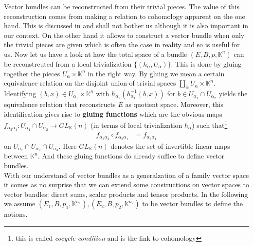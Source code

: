 Vector bundles can be reconstructed from their trivial pieces. The value of this reconstruction comes from making a relation to cohomology apparent on the one hand. This is discussed in \cite{catctxphysics} and shall not bother us although it is also important in our context. On the other hand it allows to construct a vector bundle when only the trivial pieces are given which is often the case in reality and so is useful for us. Now let us have a look at how the total space of a bundle $(E,B,p,\mathbb{K}^{n})$ can be reconstrcuted from a local trivialization $\lbrace (h_{\alpha},U_{\alpha}) \rbrace$. This is done by {\glqq}gluing together{\grqq} the pieces $U_{\alpha} \times \mathbb{K}^{n}$ in the right way. By gluing we mean a certain equivalence relation on the disjoint union of trivial spaces $\coprod_{\alpha}U_{\alpha} \times \mathbb{K}^{n}$. Identifying $(b,x) \in U_{\alpha_{1}} \times \mathbb{K}^{n}$ with $h_{\alpha_{2}}(h_{\alpha_{1}}^{-1}(b,x))$ for $b \in U_{\alpha_{1}} \cap U_{\alpha_{2}}$ yields the equivalence relation that reconstructs $E$ as quotient space. Moreover, this identification gives rise to \textbf{gluing functions} which are the obvious maps $f_{\alpha_{2}\alpha_{1}} \colon U_{\alpha_{1}} \cap U_{\alpha_{2}} \to GL_{\mathbb{K}}(n)$ (in terms of local trivialization $h_{\alpha}$) such that\footnote{this is called \textit{cocycle condition} and is the link to cohomology}
\begin{align*}
  f_{\alpha_{3}\alpha_{2}}
  \circ
  f_{\alpha_{2}\alpha_{1}}
  &=
  f_{\alpha_{3}\alpha_{1}}
\end{align*}
on $U_{\alpha_{1}} \cap U_{\alpha_{2}} \cap U_{\alpha_{3}}$. Here $GL_{\mathbb{K}}(n)$ denotes the set of invertible linear maps between $\mathbb{K}^{n}$. And these gluing functions do already suffice to define vector bundles.
\\
With our understand of vector bundles as a generalzation of a family vector space it comes as no surprise that we can extend some constructions on vector spaces to vector bundles: direct sums, scalar products and tensor products. In the following we assume $(E_{1},B,p_{1},\mathbb{K}^{n_{1}}),(E_{2},B,p_{2},\mathbb{K}^{n_{2}})$ to be vector bundles to define the notions. 
